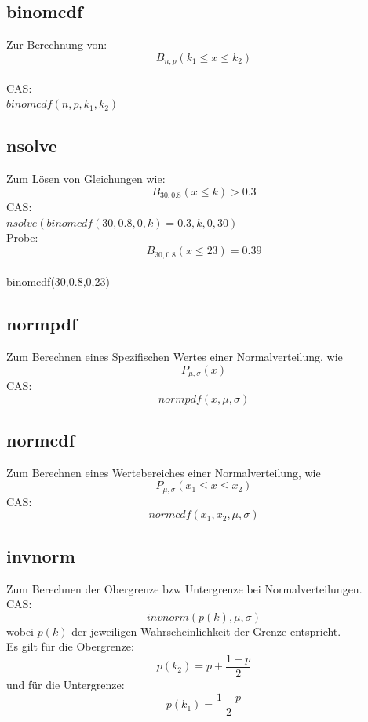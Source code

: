 \documentclass[a4paper,12pt]{article}
\begin{document}
\subsection{binomcdf}
Zur Berechnung von:\\
$$B_{n,p}(k_1 \leq x \leq k_2)$$\\
CAS:\\
$binomcdf(n,p,k_1,k_2)$\\
\pagebreak
\subsection{nsolve}
Zum Lösen von Gleichungen wie:\\
$$B_{30,0.8}(x \leq k) > 0.3$$
CAS:\\
$nsolve(binomcdf(30,0.8,0,k) = 0.3,k,0,30)$\\
Probe:\\
$$B_{30,0.8}(x \leq 23) = 0.39$$\\
binomcdf(30,0.8,0,23)
\subsection{normpdf}
Zum Berechnen eines Spezifischen Wertes einer Normalverteilung, wie
$$P_{\mu, \sigma}(x)$$
CAS:\\
$$normpdf(x, \mu, \sigma)$$
\subsection{normcdf}
Zum Berechnen eines Wertebereiches einer Normalverteilung, wie
$$P_{\mu, \sigma}(x_1 \leq x \leq x_2)$$
CAS:\\
$$normcdf(x_1, x_2, \mu, \sigma)$$
\subsection{invnorm}
Zum Berechnen der Obergrenze bzw Untergrenze bei Normalverteilungen.\\
CAS:\\
$$invnorm(p(k), \mu, \sigma)$$
wobei $p(k)$ der jeweiligen Wahrscheinlichkeit der Grenze entspricht.\\
Es gilt für die Obergrenze:
$$p(k_2) = p + \frac{1 - p}{2}$$
und für die Untergrenze:
$$p(k_1) = \frac{1 - p}{2}$$




\end{document}
